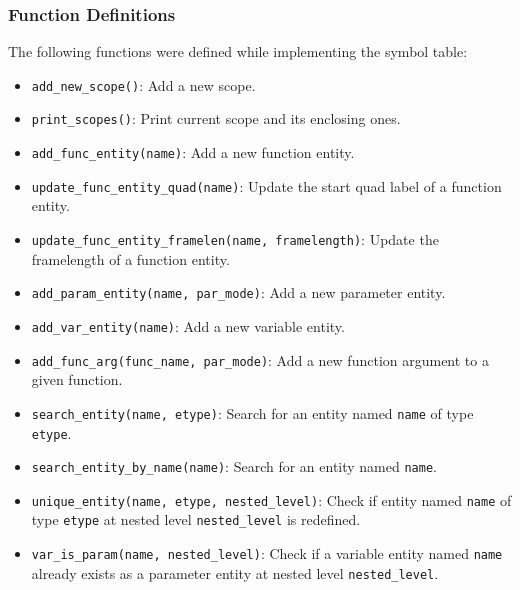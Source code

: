 \documentclass{article}
\newcommand{\pythonscript}[2]{
\begin{itemize}
\item[]
\end{itemize}
}
\def\code#1{\texttt{#1}} %
\newcommand{\enterProblemHeader}[1]{
\nobreak\extramarks{#1}{#1 continued on next page\ldots}\nobreak
\nobreak\extramarks{#1 (continued)}{#1 continued on next page\ldots}\nobreak
}
\newcommand{\exitProblemHeader}[1]{
\nobreak\extramarks{#1 (continued)}{#1 continued on next page\ldots}\nobreak
\nobreak\extramarks{#1}{}\nobreak
}
\newcounter{homeworkProblemCounter} %
\newcommand{\homeworkProblemName}{}
\newenvironment{homeworkProblem}[1][Problem \arabic{homeworkProblemCounter}]{ %
\stepcounter{homeworkProblemCounter} %
\renewcommand{\homeworkProblemName}{#1} %
\section{\homeworkProblemName} %
\enterProblemHeader{\homeworkProblemName} %
}{
\exitProblemHeader{\homeworkProblemName} %
}
\newcommand{\problemAnswer}[1]{ %
\noindent\framebox[\columnwidth][c]{\begin{minipage}{0.98\columnwidth}#1\end{minipage}} %
}
\begin{document}
\subsubsection{Function Definitions}
The following functions were defined while implementing the symbol table:
\begin{itemize}
 \item \code{add\_new\_scope()}: Add a new scope.
 \item \code{print\_scopes()}: Print current scope and its enclosing ones.
 \item \code{add\_func\_entity(name)}: Add a new function entity.
 \item \code{update\_func\_entity\_quad(name)}: Update the start quad label of a function entity.
 \item \code{update\_func\_entity\_framelen(name, framelength)}: Update the framelength of a function entity.
 \item \code{add\_param\_entity(name, par\_mode)}: Add a new parameter entity.
 \item \code{add\_var\_entity(name)}: Add a new variable entity.
 \item \code{add\_func\_arg(func\_name, par\_mode)}: Add a new function argument to a given function.
 \item \code{search\_entity(name, etype)}: Search for an entity named \code{name} of type \code{etype}.
 \item \code{search\_entity\_by\_name(name)}: Search for an entity named \code{name}.
 \item \code{unique\_entity(name, etype, nested\_level)}: Check if entity named \code{name} of type \code{etype}
                                                        at nested level \code{nested\_level} is redefined.
 \item \code{var\_is\_param(name, nested\_level)}: Check if a variable entity named \code{name} already 
                                                   exists as a parameter entity at nested level \code{nested\_level}.
\end{itemize}







% 
% 

\end{document}

